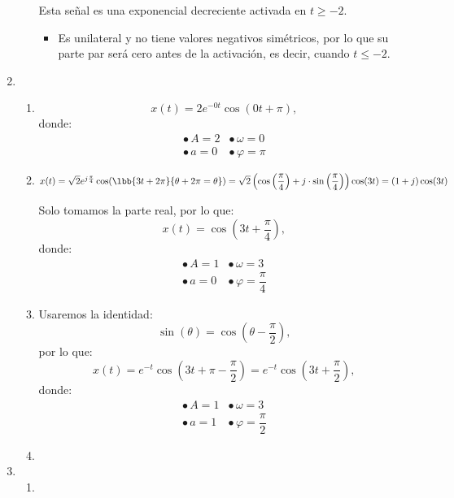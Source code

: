 \begin{enumerate}[label=\color{red}\textbf{\arabic*)}]
\begin{enumerate}[label=\color{red}\textbf{\alph*)}]
        Esta señal es una exponencial decreciente activada en $t\ge -2$.
        \begin{itemize}[label=\textbullet]
          \item Es unilateral y no tiene valores negativos simétricos, por lo que su parte par será cero antes de la activación, es decir, cuando $t\le -2$.
        \end{itemize}
    \end{enumerate}
  \item {} 
    \begin{enumerate}[label=\color{red}\textbf{\alph*)}]
      \item {} 
        \[
        x(t)=2e^{-0t}\cos(0t+\pi), 
        \] donde: \[
        \begin{array}{ll}
          \bullet\, A=2 & \bullet\, \omega=0\\
          \bullet\, a=0 & \bullet\, \varphi=\pi
        \end{array}
        \] 
      \item {} 

        $x(t)=\sqrt{2} e^{j\frac{\pi}{4} } \cos(\lbb{3t+2\pi}{\theta+2\pi=\theta})=\sqrt{2}\left( \cos\left( \dfrac{\pi}{4} \right) +j\cdot \sin\left( \dfrac{\pi}{4} \right)  \right) \cos(3t)=(1+j)\cos(3t)$

        Solo tomamos la parte real, por lo que: \[
        x(t)=\cos\left( 3t+\dfrac{\pi}{4} \right) ,
        \] donde: \[
        \begin{array}{ll}
          \bullet\, A=1 & \bullet\, \omega=3\\
          \bullet\, a=0 & \bullet\,\varphi=\dfrac{\pi}{4}
        \end{array}
        \] 
      \item {} 

        Usaremos la identidad: \[
        \sin(\theta)=\cos\left( \theta-\dfrac{\pi}{2} \right) ,
        \] por lo que: \[
        x(t)=e^{-t}\cos\left( 3t+\pi-\dfrac{\pi}{2} \right) =e^{-t}\cos\left( 3t+\dfrac{\pi}{2} \right)   ,
        \] donde: \[
        \begin{array}{ll}
          \bullet\, A=1 & \bullet\,\omega=3\\
          \bullet\, a=1 & \bullet\, \varphi=\dfrac{\pi}{2}
        \end{array}
        \] 
      \item {} 
    \end{enumerate}
  \item {}
    \begin{enumerate}[label=\color{red}\textbf{\alph*)}]
      \item {} 


\end{enumerate}
\end{enumerate}

